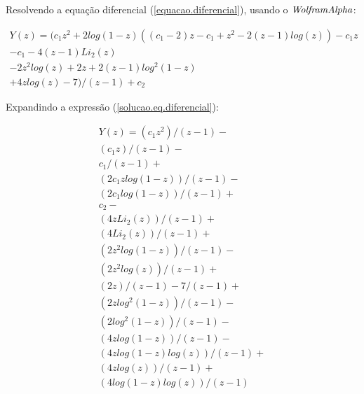 \documentclass[a4paper,10pt]{article}
\begin{document}
Resolvendo a equação diferencial (\ref{equacao.diferencial}), usando o $\it{Wolfram Alpha}$:

\begin{equation}
\begin{array}{lcl} 
Y(z) = (c_1 z^2+2 log(1-z) ((c_1-2) z-c_1+z^2-2 (z-1) log(z))-c_1 z \\
 -c_1-4 (z-1) Li_2(z) \\
 -2 z^2 log(z)+2 z+2 (z-1) log^2(1-z)\\
 +4 z log(z)-7)/(z-1)+c_2
\end{array}  
\label{solucao.eq.diferencial}
\end{equation}

Expandindo a expressão (\ref{solucao.eq.diferencial}):

\begin{equation}
\begin{array}{lcl} 
 Y(z) = (c_1 z^2)/(z-1)-\\
 (c_1 z)/(z-1)-\\
  c_1/(z-1)+\\
 (2 c_1 z log(1-z))/(z-1)-\\
 (2 c_1 log(1-z))/(z-1)+\\
 c_2-\\
 (4 z Li_2(z))/(z-1)+\\
 (4 Li_2(z))/(z-1)+\\
 (2 z^2 log(1-z))/(z-1)-\\
 (2 z^2 log(z))/(z-1)+\\
 (2 z)/(z-1)-7/(z-1)+\\
 (2 z log^2(1-z))/(z-1)-\\
 (2 log^2(1-z))/(z-1)-\\
 (4 z log(1-z))/(z-1)-\\
 (4 z log(1-z) log(z))/(z-1)+\\
 (4 z log(z))/(z-1)+\\
 (4 log(1-z) log(z))/(z-1)
\end{array}
\end{equation}
\end{document}
